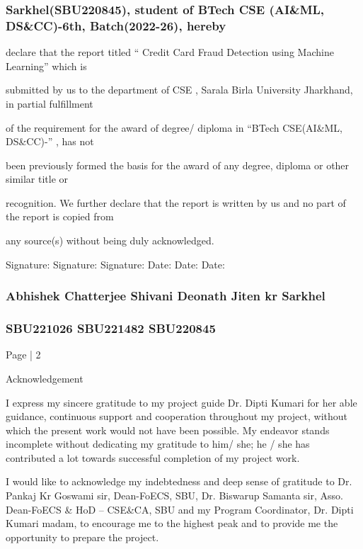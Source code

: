 \documentclass[11pt,a4paper]{article}
\begin{document}
\subsubsection*{Sarkhel(SBU220845), student of BTech CSE (AI\&ML, DS\&CC)-6th, Batch(2022-26), hereby }

declare that the report titled “ Credit Card Fraud Detection using Machine Learning” which is 

submitted by us to the department of CSE , Sarala Birla University Jharkhand, in partial fulfillment 

of the requirement for the award of degree/ diploma in “BTech CSE(AI\&ML, DS\&CC)-” , has not 

been previously formed the basis for the award of any degree, diploma or other similar title or 

recognition. We further declare that the report is written by us and no part of the report is copied from 

any source(s) without being duly acknowledged.  

Signature: 
Signature: 
Signature: 
Date:                                                   Date:                                        Date: 

\subsubsection*{Abhishek Chatterjee  
            Shivani Deonath 
           Jiten kr Sarkhel }

\subsubsection*{SBU221026 
SBU221482 
SBU220845 }

Page | 2  

\newpage

{\Large Acknowledgement }

I express my sincere gratitude to my project guide Dr. Dipti Kumari for her able guidance, 
continuous support and cooperation throughout my project, without which the present work would 
not have been possible. My endeavor stands incomplete without dedicating my gratitude to him/ she; 
he / she has contributed a lot towards successful completion of my project work. 

I would like to acknowledge my indebtedness and deep sense of gratitude to Dr. Pankaj Kr Goswami 
sir, Dean-FoECS, SBU, Dr. Biswarup Samanta sir, Asso. Dean-FoECS \& HoD – CSE\&CA, SBU 
and my Program Coordinator, Dr. Dipti Kumari madam, to encourage me to the highest peak and 
to provide me the opportunity to prepare the project. 
\end{document}
